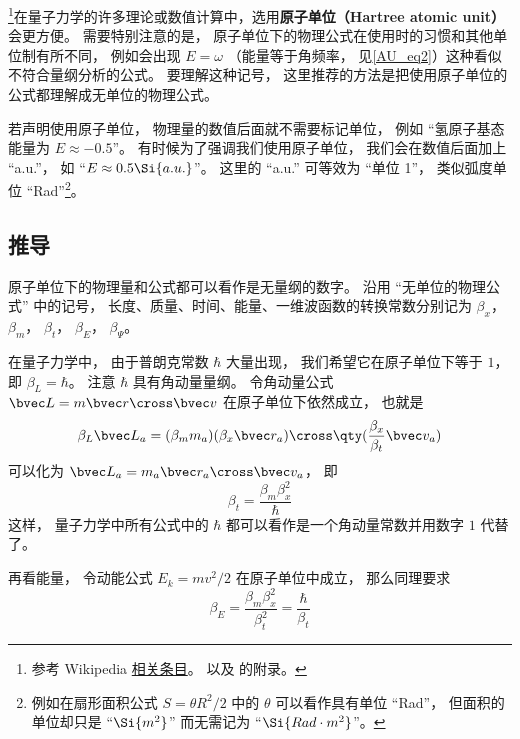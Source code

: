 

\footnote{参考 Wikipedia \href{https://en.wikipedia.org/wiki/Hartree_atomic_units}{相关条目}。 以及 \cite{Bransden} 的附录。}在量子力学的许多理论或数值计算中，选用\textbf{原子单位（Hartree atomic unit）}会更方便。 需要特别注意的是， 原子单位下的物理公式在使用时的习惯和其他单位制有所不同， 例如会出现 $E = \omega$ （能量等于角频率， 见\autoref{AU_eq2}）这种看似不符合量纲分析的公式。 要理解这种记号， 这里推荐的方法是把使用原子单位的公式都理解成无单位的物理公式。

若声明使用原子单位， 物理量的数值后面就不需要标记单位， 例如 “氢原子基态能量为 $E \approx -0.5$”。 有时候为了强调我们使用原子单位， 我们会在数值后面加上 “a.u.”， 如 “$E \approx 0.5 \Si{a.u.}$”。 这里的 “a.u.” 可等效为 “单位 1”， 类似弧度单位 “Rad”\footnote{例如在扇形面积公式 $S = \theta R^2/2$ 中的 $\theta$ 可以看作具有单位 “Rad”， 但面积的单位却只是 “$\Si{m^2}$” 而无需记为 “$\Si{Rad\cdot m^2}$”。}。

\subsection{推导}\label{AU_sub1}
原子单位下的物理量和公式都可以看作是无量纲的数字。 沿用 “无单位的物理公式” 中的记号， 长度、质量、时间、能量、一维波函数的转换常数分别记为 $\beta_x$， $\beta_m$， $\beta_t$， $\beta_E$， $\beta_\Psi$。

在量子力学中， 由于普朗克常数 $\hbar$ 大量出现， 我们希望它在原子单位下等于 $1$， 即 $\beta_L = \hbar$。 注意 $\hbar$ 具有角动量量纲。 令角动量公式 $\bvec L = m \bvec r \cross \bvec v$ 在原子单位下依然成立， 也就是
\begin{equation}
\beta_L\bvec L_a = (\beta_m m_a) (\beta_x \bvec r_a) \cross \qty(\frac{\beta_x}{\beta_t} \bvec v_a)
\end{equation}
可以化为 $\bvec L_a = m_a \bvec r_a \cross \bvec v_a$， 即
\begin{equation}\label{AU_eq6}
\beta_t = \frac{\beta_m \beta_x^2}{\hbar}
\end{equation}
这样， 量子力学中所有公式中的 $\hbar$ 都可以看作是一个角动量常数并用数字 $1$ 代替了。

再看能量， 令动能公式 $E_k = mv^2/2$ 在原子单位中成立， 那么同理要求
\begin{equation}\label{AU_eq7}
\beta_E = \frac{\beta_m \beta_x^2}{\beta_t^2} = \frac{\hbar}{\beta_t}
\end{equation}

